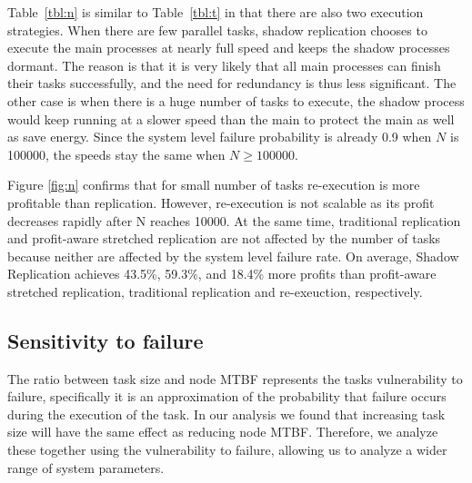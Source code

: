 Table~\ref{tbl:n} is similar to Table~\ref{tbl:t} in that there are also two execution strategies. When there are few parallel tasks, shadow
replication chooses to execute the main processes at nearly full speed and keeps
the shadow processes dormant. The
reason is that it is very likely that all main processes can finish
their tasks successfully, and the need for redundancy is thus less
significant. The other case is when there is a huge number of
tasks to execute, the shadow process would keep running at a slower speed than the main to protect the main as well as save energy. Since the system level failure probability is already 0.9 when $N$ is 100000, the speeds stay the same when $N \ge 100000$.

Figure \ref{fig:n} confirms that for small number of tasks
re-execution is more profitable than replication. However, re-execution is not scalable
as its profit decreases rapidly after N reaches 10000. At the same time, traditional
replication and profit-aware stretched replication are not
affected by the number of tasks because neither are affected by the
system level failure rate. On average, Shadow Replication achieves 43.5\%, 59.3\%, and 18.4\%
more profits than profit-aware stretched replication, traditional replication and re-exeuction, respectively. 

\subsection{Sensitivity to failure}

The ratio between task size and node MTBF represents the tasks
vulnerability to failure, specifically it is an approximation of the
probability that failure occurs during the execution of the task. In our
analysis we found that increasing task size will have the same effect
as reducing node MTBF. Therefore, we analyze these together using the
vulnerability to failure, allowing us to analyze a wider range of
system parameters. %

%	


